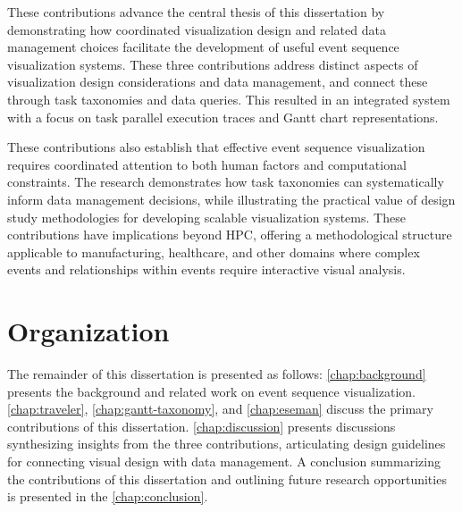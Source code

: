\begin{refsection}
These contributions advance the central thesis of this dissertation by demonstrating how coordinated visualization design and related data management choices facilitate the development of useful event sequence visualization systems. These three contributions address distinct aspects of visualization design considerations and data management, and connect these through task taxonomies and data queries. This resulted in an integrated system with a focus on task parallel execution traces and Gantt chart representations.

These contributions also establish that effective event sequence visualization requires coordinated attention to both human factors and computational constraints. The research demonstrates how task taxonomies can systematically inform data management decisions, while illustrating the practical value of design study methodologies for developing scalable visualization systems. These contributions have implications beyond HPC, offering a methodological structure applicable to manufacturing, healthcare, and other domains where complex events and relationships within events require interactive visual analysis.

\section{Organization}
\label{sec:org}
The remainder of this dissertation is presented as follows: \autoref{chap:background} presents the background and related work on event sequence visualization. \autoref{chap:traveler}, \autoref{chap:gantt-taxonomy}, and \autoref{chap:eseman} discuss the primary contributions of this dissertation. \autoref{chap:discussion} presents discussions synthesizing insights from the three contributions, articulating design guidelines for connecting visual design with data management. A conclusion summarizing the contributions of this dissertation and outlining future research opportunities is presented in the \autoref{chap:conclusion}.

\printbibliography[heading=subbibnumbered]
\end{refsection}